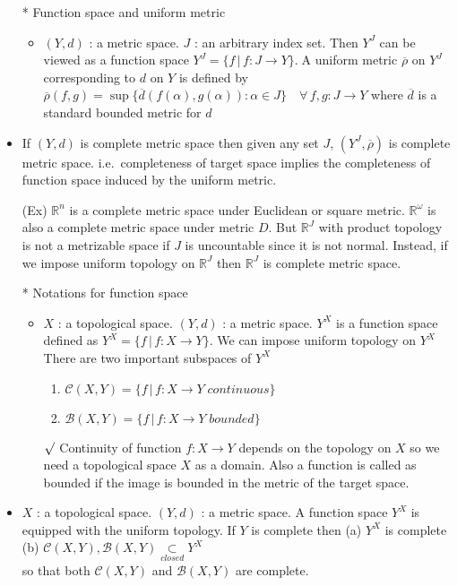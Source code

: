\documentclass[12pt]{article}
\newcommand{\rmk}{$\surd$}
\newcommand{\Real}{\mathbb{R}}
\newcommand{\B}{\mathcal{B}}
\newcommand{\C}{\mathcal{C}}
\newcommand{\closed}{\underset{closed}{\subset}}
\begin{document}
\begin{itemize}
    \item[*] Function space and uniform metric
    \begin{itemize}
        \item $(Y,d)$ : a metric space. $J$ : an arbitrary index set. Then $Y^J$ can be viewed as a function space $Y^J=\{f\,|\, f: J\rightarrow Y\}. \; $A uniform metric $\overline{\rho}$ on $Y^J$ corresponding to $d$ on $Y$ is defined by
		$\overline{\rho}(f,g)=\sup\{\overline{d}(f(\alpha), g(\alpha)) : \alpha \in J\} \quad \forall \, f,g : J\rightarrow Y$\; where $\overline{d}$ is a standard bounded metric for $d$
    \end{itemize}
    \item If $(Y,d)$ is complete metric space then given any set $J$, $(Y^J, \overline{\rho})$ is complete metric space. \; i.e.\, completeness of target space implies the completeness of function space induced by the uniform metric.
    \item[(Ex)] $\Real^n$ is a complete metric space under Euclidean or square metric. $\Real^\omega$ is also a complete metric space under metric $D$. But $\Real^J$ with product topology is not a metrizable space if $J$ is uncountable since it is not normal. Instead, if we impose uniform topology on $\Real^J$ then $\Real^J$ is complete metric space.
 \clearpage
	\item[*] Notations for function space
    \begin{itemize}
        \item $X$ : a topological space. $(Y,d)$ : a metric space. $Y^X$ is a function space defined as $Y^X=\{f\,|\, f: X\rightarrow Y \}$. We can impose uniform topology on $Y^X$
        \\ There are two important subspaces of $Y^X$
        \begin{enumerate}
            \item $\C(X,Y)=\{f\,|\, f:X\rightarrow Y \; continuous\}$
            \item $\B(X,Y)=\{f\,|\, f:X\rightarrow Y \; bounded\}$
        \end{enumerate}
        \item[\rmk] Continuity of function $f: X\rightarrow Y$ depends on the topology on $X$ so we need a topological space $X$ as a domain. Also a function is called as bounded if the image is bounded in the metric of the target space.
    \end{itemize}
    \item $X$ : a topological space. $(Y,d)$ : a metric space. A function space $Y^X$ is equipped with the uniform topology. If $Y $ is complete then (a) $Y^X$ is complete  (b) $\C(X,Y), \B(X,Y)\closed Y^X$ \\ so that both $\C(X,Y)$ and $\B(X,Y)$ are complete.

\end{itemize}
\end{document}
